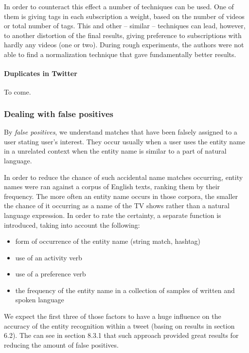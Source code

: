 In order to counteract this effect a number of techniques can be used. One of
them is giving tags in each subscription a weight, based on the number of videos or
total number of tags. This and other -- similar -- techniques can lead,
however, to another distortion of the final results, giving preference to
subscriptions with hardly any videos (one or two). During rough experiments,
the authors were not able to find a normalization technique that gave
fundamentally better results.

\paragraph{Duplicates in Twitter}
To come.

\subsubsection{Dealing with false positives}
By \textit{false positives}, we understand matches that have been falsely assigned to a user stating user's interest.
They occur usually when a user uses the entity name in a unrelated context when the entity name is similar to a
part of natural language.

In order to reduce the chance of such accidental name matches occurring, entity names were ran against a corpus
of English texts, ranking them by their frequency. The more often an entity name occurs in those corpora, the smaller the chance of it occurring as a name of the TV shows rather than a natural language expression. In order to rate the certainty, a separate function is introduced, taking into account the following:

\begin{itemize}
  \item form of occurrence of the entity name (string match, hashtag)
  \item use of an activity verb
  \item use of a preference verb
  \item the frequency of the entity name in a collection of samples of written and spoken language
\end{itemize}

We expect the first three of those factors to have a huge influence on the accuracy of the entity recognition within a tweet (basing on results in section 6.2). The can see in section 8.3.1 that such approach provided great results for
reducing the amount of false positives.

